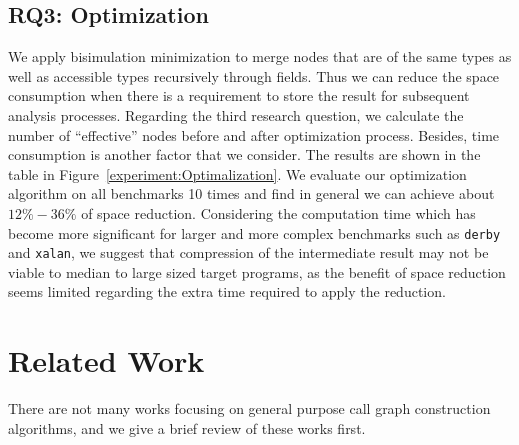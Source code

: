 \documentclass[runningheads]{llncs}
\begin{document}
\subsection{RQ3: Optimization}\label{subsec:optimization}

We apply bisimulation minimization to merge nodes that are of the same types as well as accessible types recursively through fields. Thus we can reduce the space consumption when there is a requirement to store the result for subsequent analysis processes. Regarding the third research question, we calculate the number of ``effective'' nodes before and after optimization process. Besides, time consumption is another factor that we consider. The results are shown in the table in Figure~\ref{experiment:Optimalization}. We evaluate our optimization algorithm on all benchmarks 10 times and find in general we can achieve about $12\%-36\%$ of space reduction. Considering the computation time which has become more significant for larger and more complex benchmarks such as \texttt{derby} and \texttt{xalan}, we suggest that compression of the intermediate result may not be viable to median to large sized target programs, as the benefit of space reduction seems limited regarding the extra time required to apply the reduction.



\section{Related Work}\label{sec:related-work}

There are not many works focusing on general purpose call graph construction algorithms, and we give a brief review of these works first.
\end{document}
